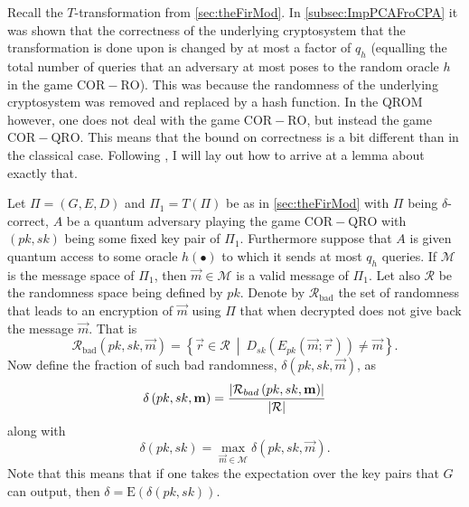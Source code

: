 Recall the $T$-transformation from \cref{sec:theFirMod}. In \cref{subsec:ImpPCAFroCPA} it was shown that the correctness of the underlying cryptosystem that the transformation is done upon is changed by at most a factor of $q_h$ (equalling the total number of queries that an adversary at most poses to the random oracle $h$ in the game $\mathrm{COR-RO}$). This was because the randomness of the underlying cryptosystem was removed and replaced by a hash function. In the QROM however, one does not deal with the game $\mathrm{COR-RO}$, but instead the game $\mathrm{COR-QRO}$. This means that the bound on correctness is a bit different than in the classical case. Following \cite{HHK}, I will lay out how to arrive at a lemma about exactly that.

Let $\Pi = \left(G,E,D\right)$ and $\Pi_1 = T\left(\Pi\right)$ be as in \cref{sec:theFirMod} with $\Pi$ being $\delta$-correct, $A$ be a quantum adversary playing the game $\mathrm{COR-QRO}$ with $\left(pk, sk\right)$ being some fixed key pair of $\Pi_1$. Furthermore suppose that $A$ is given quantum access to some oracle $h\left(\bullet\right)$ to which it sends at most $q_h$ queries. If $\mathcal{M}$ is the message space of $\Pi_1$, then $\vec{m} \in \mathcal{M}$ is a valid message of $\Pi_1$. Let also $\mathcal{R}$ be the randomness space being defined by $pk$. Denote by $\mathcal{R}_{\mathrm{bad}}$ the set of randomness that leads to an encryption of $\vec{m}$ using $\Pi$ that when decrypted does not give back the message $\vec{m}$. That is
\[
	\mathcal{R}_{\mathrm{bad}}\left(pk, sk, \vec{m}\right) = \left\{ \vec{r} \in \mathcal{R} \ \middle\vert \ D_{sk}\left(E_{pk}\left( \vec{m}; \vec{r}\right)\right) \neq \vec{m} \right\}.
\]
Now define the fraction of such bad randomness, $\delta\left(pk, sk, \vec{m}\right)$, as
\[
	\delta\left(pk, sk, \boldsymbol{\mathrm{m}}\right) = \frac{\left\vert \mathcal{R}_{bad}\left(pk,sk, \boldsymbol{\mathrm{m}}\right) \right\vert}{\left\vert \mathcal{R} \right\vert}
\]
along with
\[
	\delta\left(pk,sk\right) = \max\limits_{\vec{m} \in \mathcal{M}} \delta\left(pk, sk, \vec{m}\right).
\]
Note that this means that if one takes the expectation over the key pairs that $G$ can output, then $\delta = \mathrm{E}\left(\delta\left(pk,sk\right)\right)$.

